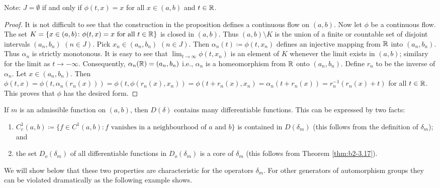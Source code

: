 Note: $J = \emptyset$ if and only if $\phi(t,x) = x$ for all $x \in (a,b)$ and $t \in \mathbb{R}$.
\begin{proof}
It is not difficult to see that the construction in the proposition defines a continuous flow on $(a,b)$.
Now let $\phi$ be a continuous flow.
The set $K = \{ x \in (a,b) \colon \phi(t,x) = x \text{ for all } t \in \mathbb{R} \}$ is closed in $(a,b)$.
Thus $(a,b) \setminus K$ is the union of a finite or countable set of disjoint intervals $(a_{n},b_{n})$ $(n \in J)$.
Pick $x_{n} \in (a_{n},b_{n})$ $(n \in J)$.
Then $\alpha_{n}(t) \coloneqq \phi(t,x_{n})$ defines an injective mapping from $\mathbb{R}$ into $(a_{n},b_{n})$.
Thus $\alpha_{n}$ is strictly monotonous.
It is easy to see that $\lim_{t \to \infty} \phi(t,x_{n})$ is an element of $K$ whenever the limit exists in $(a,b)$; similary for the limit as $t \to -\infty$.
Consequently, $\alpha_{n}(\mathbb{R}) = (a_{n},b_{n})$ i.e., $\alpha_{n}$ is a homeomorphism from $\mathbb{R}$ onto $(a_{n},b_{n})$.
Define $r_{n}$ to be the inverse of $\alpha_{n}$.
Let $x \in (a_{n},b_{n})$.
Then $\phi(t,x) = \phi(t, \alpha_{n}(r_{n}(x))) = \phi(t, \phi(r_{n}(x),x_{n})) = \phi(t + r_{n}(x),x_{n}) = \alpha_{n}(t + r_{n}(x)) = r_{n}^{-1}(r_{n}(x) + t)$ for all $t \in \mathbb{R}$.
This proves that $\phi$ has the desired form.
\end{proof}
If $m$ is an admissible function on $(a,b)$, then $D(\delta)$ contains many differentiable functions.
This can be expressed by two facts:
\begin{enumerate}[\upshape (i)]
\item \label{enum:b2-3-1.1}
$C_{c}^{1}(a,b) \coloneqq \{ f \in C^{1}(a,b) \colon f \text{ vanishes in a neighbourhood of } a \text{ and } b\}$ is contained in $D(\delta_{m})$ (this follows from the definition of $\delta_{m}$); and
\item  \label{enum:b2-3-1.2}
the set $D_{o}(\delta_{m})$ of all differentiable functions in $D_{o}(\delta_{m})$ is a core of $\delta_{m}$ (this follows from Theorem \ref{thm:b2-3.17}).
\end{enumerate}
We will show below that these two properties are characteristic for the operators $\delta_{m}$.
For other generators of automorphism groups they can be violated dramatically as the following example shows.
